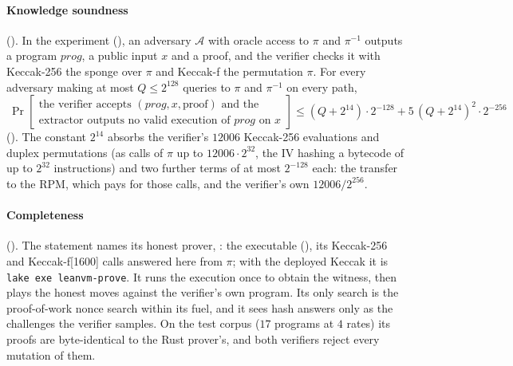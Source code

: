 \documentclass[11pt]{article}
\begin{document}
\paragraph{Knowledge soundness} (). In the experiment
(), an adversary $\mathcal{A}$ with oracle access to $\pi$ and
$\pi^{-1}$ outputs a program $\mathit{prog}$, a public input $x$ and a proof, and the verifier
checks it with Keccak-256 the sponge over $\pi$ and Keccak-f the permutation $\pi$. For every
adversary making at most $Q \le 2^{128}$ queries to $\pi$ and $\pi^{-1}$ on every path,
\[
\boxed{\ \Pr\left[\begin{array}{l}\text{the verifier accepts } (\mathit{prog},x,\text{proof}) \text{ and the}\\
\text{extractor outputs no valid execution of } \mathit{prog} \text{ on } x\end{array}\right]
\le (Q+2^{14})\cdot 2^{-128} + 5\,(Q+2^{14})^2\cdot 2^{-256}\ }
\]
(). The constant $2^{14}$ absorbs the verifier's $12006$
Keccak-256 evaluations and duplex permutations (as calls of $\pi$ up to $12006\cdot 2^{32}$, the IV
hashing a bytecode of up to $2^{32}$ instructions) and two further terms of at most $2^{-128}$ each:
the transfer to the RPM, which pays for those calls, and the verifier's own $12006/2^{256}$.

\paragraph{Completeness} (). The statement names its honest prover,
: the executable 
(), its Keccak-256 and Keccak-f[1600] calls answered here from $\pi$; with
the deployed Keccak it is \texttt{lake exe leanvm-prove}. It runs the execution once to obtain the
witness, then plays the honest moves against the verifier's own program. Its only search is the
proof-of-work nonce search within its fuel, and it sees hash answers only as the challenges the
verifier samples. On the test corpus ($17$ programs at $4$ rates) its proofs are byte-identical to
the Rust prover's, and both verifiers reject every mutation of them.
\end{document}
